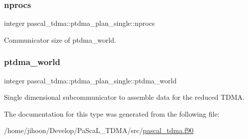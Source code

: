 \subsubsection{\texorpdfstring{nprocs}{nprocs}}
{\footnotesize\ttfamily integer pascal\+\_\+tdma\+::ptdma\+\_\+plan\+\_\+single\+::nprocs}



Communicator size of ptdma\+\_\+world. 

\mbox{\label{structpascal__tdma_1_1ptdma__plan__single_a073cddefd8ef983b185b6727d8ad7de6}} 
\subsubsection{\texorpdfstring{ptdma\+\_\+world}{ptdma\_world}}
{\footnotesize\ttfamily integer pascal\+\_\+tdma\+::ptdma\+\_\+plan\+\_\+single\+::ptdma\+\_\+world}



Single dimensional subcommunicator to assemble data for the reduced T\+D\+MA. 



The documentation for this type was generated from the following file\+:\begin{DoxyCompactItemize}
\item 
/home/jihoon/\+Develop/\+Pa\+Sca\+L\+\_\+\+T\+D\+M\+A/src/\hyperlink{pascal__tdma_8f90}{pascal\+\_\+tdma.\+f90}\end{DoxyCompactItemize}
